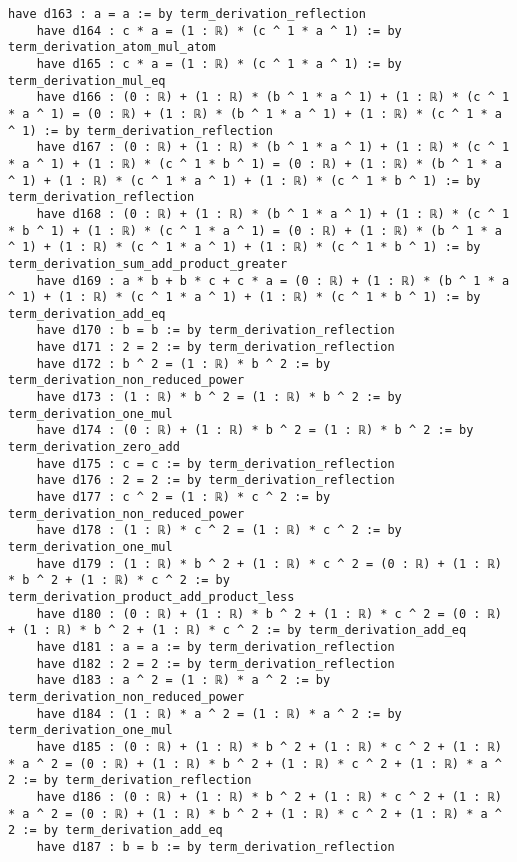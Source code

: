 \documentclass{article}
\begin{document}
\begin{tcolorbox}[colback=white!10, width=\linewidth]
\begin{lstlisting}[language=Lean4]
    have d163 : a = a := by term_derivation_reflection
    have d164 : c * a = (1 : ℝ) * (c ^ 1 * a ^ 1) := by term_derivation_atom_mul_atom
    have d165 : c * a = (1 : ℝ) * (c ^ 1 * a ^ 1) := by term_derivation_mul_eq
    have d166 : (0 : ℝ) + (1 : ℝ) * (b ^ 1 * a ^ 1) + (1 : ℝ) * (c ^ 1 * a ^ 1) = (0 : ℝ) + (1 : ℝ) * (b ^ 1 * a ^ 1) + (1 : ℝ) * (c ^ 1 * a ^ 1) := by term_derivation_reflection
    have d167 : (0 : ℝ) + (1 : ℝ) * (b ^ 1 * a ^ 1) + (1 : ℝ) * (c ^ 1 * a ^ 1) + (1 : ℝ) * (c ^ 1 * b ^ 1) = (0 : ℝ) + (1 : ℝ) * (b ^ 1 * a ^ 1) + (1 : ℝ) * (c ^ 1 * a ^ 1) + (1 : ℝ) * (c ^ 1 * b ^ 1) := by term_derivation_reflection
    have d168 : (0 : ℝ) + (1 : ℝ) * (b ^ 1 * a ^ 1) + (1 : ℝ) * (c ^ 1 * b ^ 1) + (1 : ℝ) * (c ^ 1 * a ^ 1) = (0 : ℝ) + (1 : ℝ) * (b ^ 1 * a ^ 1) + (1 : ℝ) * (c ^ 1 * a ^ 1) + (1 : ℝ) * (c ^ 1 * b ^ 1) := by term_derivation_sum_add_product_greater
    have d169 : a * b + b * c + c * a = (0 : ℝ) + (1 : ℝ) * (b ^ 1 * a ^ 1) + (1 : ℝ) * (c ^ 1 * a ^ 1) + (1 : ℝ) * (c ^ 1 * b ^ 1) := by term_derivation_add_eq
    have d170 : b = b := by term_derivation_reflection
    have d171 : 2 = 2 := by term_derivation_reflection
    have d172 : b ^ 2 = (1 : ℝ) * b ^ 2 := by term_derivation_non_reduced_power
    have d173 : (1 : ℝ) * b ^ 2 = (1 : ℝ) * b ^ 2 := by term_derivation_one_mul
    have d174 : (0 : ℝ) + (1 : ℝ) * b ^ 2 = (1 : ℝ) * b ^ 2 := by term_derivation_zero_add
    have d175 : c = c := by term_derivation_reflection
    have d176 : 2 = 2 := by term_derivation_reflection
    have d177 : c ^ 2 = (1 : ℝ) * c ^ 2 := by term_derivation_non_reduced_power
    have d178 : (1 : ℝ) * c ^ 2 = (1 : ℝ) * c ^ 2 := by term_derivation_one_mul
    have d179 : (1 : ℝ) * b ^ 2 + (1 : ℝ) * c ^ 2 = (0 : ℝ) + (1 : ℝ) * b ^ 2 + (1 : ℝ) * c ^ 2 := by term_derivation_product_add_product_less
    have d180 : (0 : ℝ) + (1 : ℝ) * b ^ 2 + (1 : ℝ) * c ^ 2 = (0 : ℝ) + (1 : ℝ) * b ^ 2 + (1 : ℝ) * c ^ 2 := by term_derivation_add_eq
    have d181 : a = a := by term_derivation_reflection
    have d182 : 2 = 2 := by term_derivation_reflection
    have d183 : a ^ 2 = (1 : ℝ) * a ^ 2 := by term_derivation_non_reduced_power
    have d184 : (1 : ℝ) * a ^ 2 = (1 : ℝ) * a ^ 2 := by term_derivation_one_mul
    have d185 : (0 : ℝ) + (1 : ℝ) * b ^ 2 + (1 : ℝ) * c ^ 2 + (1 : ℝ) * a ^ 2 = (0 : ℝ) + (1 : ℝ) * b ^ 2 + (1 : ℝ) * c ^ 2 + (1 : ℝ) * a ^ 2 := by term_derivation_reflection
    have d186 : (0 : ℝ) + (1 : ℝ) * b ^ 2 + (1 : ℝ) * c ^ 2 + (1 : ℝ) * a ^ 2 = (0 : ℝ) + (1 : ℝ) * b ^ 2 + (1 : ℝ) * c ^ 2 + (1 : ℝ) * a ^ 2 := by term_derivation_add_eq
    have d187 : b = b := by term_derivation_reflection

\end{lstlisting}
\end{tcolorbox}
\end{document}
